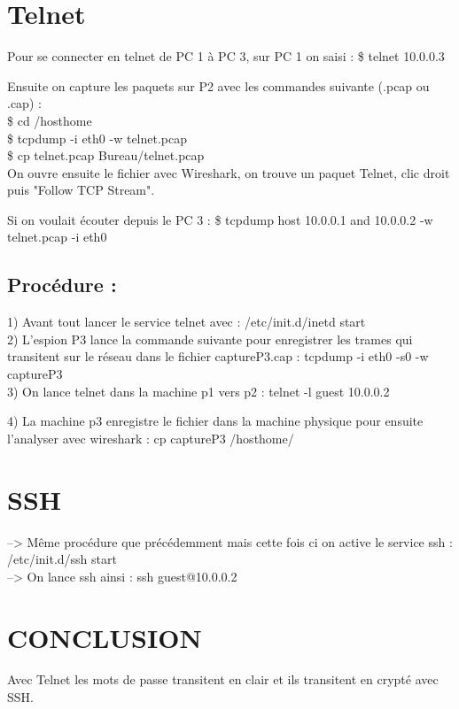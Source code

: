 \documentclass[a4paper]{article}
\begin{document}
	
	\section{Telnet}
	
Pour se 	connecter en telnet de PC 1 à PC 3, sur PC 1 on saisi : \$ telnet 10.0.0.3

Ensuite on capture les paquets sur P2 avec les commandes suivante (.pcap ou .cap) : \\
\$ cd /hosthome \\
\$ tcpdump -i eth0 -w telnet.pcap \\
\$ cp telnet.pcap Bureau/telnet.pcap \\

On ouvre ensuite le fichier avec Wireshark, on trouve un paquet Telnet, clic droit puis "Follow TCP Stream". 

Si on voulait écouter depuis le PC 3 : \$ tcpdump host 10.0.0.1 and 10.0.0.2 -w telnet.pcap -i eth0 

		\subsection{Procédure :}
			
1) Avant tout lancer le service telnet avec : /etc/init.d/inetd start	\\

	
2) L'espion P3 lance la commande suivante pour enregistrer les trames qui transitent sur le réseau dans le fichier captureP3.cap : tcpdump -i eth0 -s0 -w captureP3 \\


3) On lance telnet dans la machine p1 vers p2 : telnet -l guest 10.0.0.2

4) La machine p3 enregistre le fichier dans la machine physique pour ensuite l'analyser avec wireshark : cp captureP3 /hosthome/

	
	\section{SSH}

--> Même procédure que précédemment mais cette fois ci on active le service ssh : /etc/init.d/ssh start  \\
--> On lance ssh ainsi : ssh guest@10.0.0.2

	\section{CONCLUSION}
	
Avec Telnet les mots de passe transitent en clair et ils transitent en crypté avec SSH. 	
	
\end{document}
